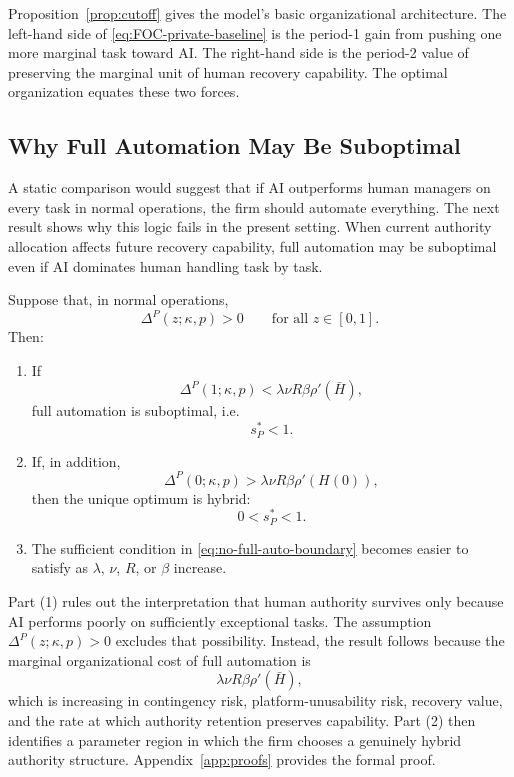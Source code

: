 Proposition~\ref{prop:cutoff} gives the model's basic organizational architecture. The left-hand side of \eqref{eq:FOC-private-baseline} is the period-1 gain from pushing one more marginal task toward AI. The right-hand side is the period-2 value of preserving the marginal unit of human recovery capability. The optimal organization equates these two forces.

\subsection{Why Full Automation May Be Suboptimal}
\label{subsec:no-full-automation}

A static comparison would suggest that if AI outperforms human managers on every task in normal operations, the firm should automate everything. The next result shows why this logic fails in the present setting. When current authority allocation affects future recovery capability, full automation may be suboptimal even if AI dominates human handling task by task.

\begin{proposition}
\label{prop:no-full-automation}
Suppose that, in normal operations,
\[
\Delta^P(z;\kappa,p)>0
\qquad
\text{for all } z\in[0,1].
\]
Then:

\begin{enumerate}
\item If
\begin{equation}
\label{eq:no-full-auto-boundary}
\Delta^P(1;\kappa,p)<\lambda \nu R \beta \rho'(\bar H),
\end{equation}
full automation is suboptimal, i.e.
\[
s_P^\ast<1.
\]

\item If, in addition,
\begin{equation}
\label{eq:hybrid-boundary}
\Delta^P(0;\kappa,p)>\lambda \nu R \beta \rho'(H(0)),
\end{equation}
then the unique optimum is hybrid:
\[
0<s_P^\ast<1.
\]

\item The sufficient condition in \eqref{eq:no-full-auto-boundary} becomes easier to satisfy as $\lambda$, $\nu$, $R$, or $\beta$ increase.
\end{enumerate}
\end{proposition}

Part (1) rules out the interpretation that human authority survives only because AI performs poorly on sufficiently exceptional tasks. The assumption $\Delta^P(z;\kappa,p)>0$ excludes that possibility. Instead, the result follows because the marginal organizational cost of full automation is
\[
\lambda \nu R \beta \rho'(\bar H),
\]
which is increasing in contingency risk, platform-unusability risk, recovery value, and the rate at which authority retention preserves capability. Part (2) then identifies a parameter region in which the firm chooses a genuinely hybrid authority structure. Appendix~\ref{app:proofs} provides the formal proof.


